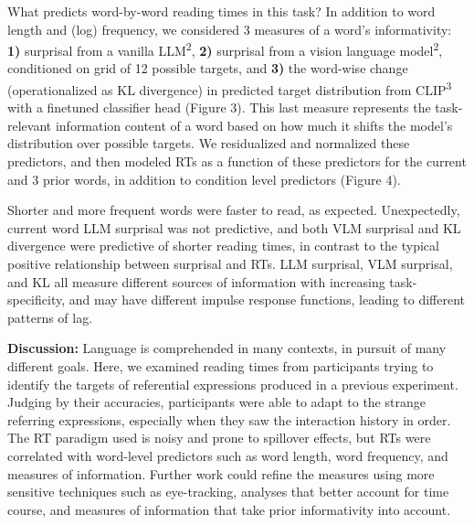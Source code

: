 \documentclass[11pt,a4paper]{article}
\begin{document}
What predicts word-by-word reading times in this task? In addition to word length and (log) frequency, we considered 3 measures of a word's informativity: \textbf{1)} surprisal from a vanilla LLM\textsuperscript{2}, \textbf{2)} surprisal from a vision language model\textsuperscript{2}, conditioned on grid of 12 possible targets, and \textbf{3)} the word-wise change (operationalized as KL divergence) in predicted target distribution from CLIP\textsuperscript{3} with a finetuned classifier head (Figure 3). This last measure represents the task-relevant information content of a word based on how much it shifts the model's distribution over possible targets. We residualized and normalized these predictors, and then modeled RTs as a function of these predictors for the current and 3 prior words, in addition to condition level predictors (Figure 4).

 Shorter and more frequent words were faster to read, as expected. Unexpectedly, current word LLM surprisal was not predictive, and both VLM surprisal and KL divergence were predictive of shorter reading times, in contrast to the typical positive relationship between surprisal and RTs. LLM surprisal, VLM surprisal, and KL all measure different sources of information with increasing task-specificity, and may have different impulse response functions, leading to different patterns of lag. 

\smallskip 

\textbf{Discussion:} Language is comprehended in many contexts, in pursuit of many different goals. Here, we examined reading times from participants trying to identify the targets of referential expressions produced in a previous experiment. Judging by their accuracies, participants were able to adapt to the strange referring expressions, especially when they saw the interaction history in order. The RT paradigm used is noisy and prone to spillover effects, but RTs were correlated with word-level predictors such as word length, word frequency, and measures of information.  Further work could refine the measures using more sensitive techniques such as eye-tracking, analyses that better account for time course, and measures of information that take prior informativity into account.


\newpage
\end{document}
